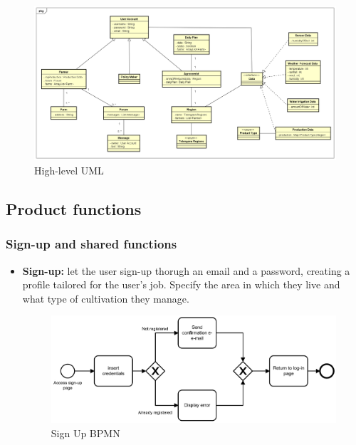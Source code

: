\documentclass[table, 12pt]{article}
\begin{document}
\begin{center}
    \begin{figure}[!h]
        \hspace{-110px}
        \includegraphics[scale=0.45]{assets/UML/UML.png}
        \caption{High-level UML}
        \label{fig: UML}
    \end{figure}
\end{center}
\newpage
\subsection{Product functions}
\label{product_functions}
\subsubsection{Sign-up and shared functions}
\begin{itemize}
    \item \textbf{Sign-up:} let the user sign-up thorugh an email and a password, creating a profile tailored for the user's job. Specify the area in which they live and what type of cultivation they manage.
    \begin{center}
        \begin{figure}[!h]
            \includegraphics[width=\textwidth]{assets/BPMN/SignUpBpmn}
            \caption{Sign Up BPMN}
            \label{fig: singup}
        \end{figure}
    \end{center}
\end{itemize}
\end{document}

